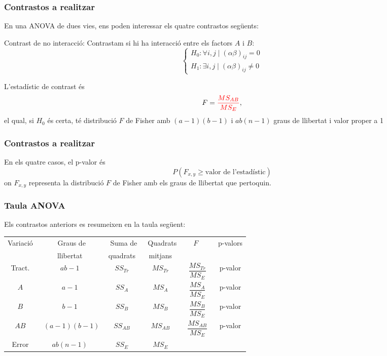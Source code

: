 \documentclass[12pt,t]{beamer}
\newcommand{\red}[1]{\textcolor{red}{#1}}
\renewcommand{\emph}[1]{{\color{red}#1}}
\renewcommand{\geq}{\geqslant}
\theoremstyle{plain}
\theoremstyle{definition}
\begin{document}
\begin{frame}
\frametitle{Contrastos a realitzar}

En una ANOVA de dues vies, ens poden interessar 
els quatre contrastos següents:
\bigskip

\emph{Contrast de no interacció}: Contrastam si  hi ha interacció entre
els factors $A$ i $B$:
$$
\left\{
\begin{array}{l}
H_0 :  \forall i,j\mid (\alpha\beta)_{ij} =0 \\
H_1 :  \exists i,j\mid (\alpha\beta)_{ij}
\not = 0
\end{array}
\right.
$$
\medskip

L'estadístic de contrast és
$$
F = \red{\frac{MS_{AB}}{MS_E}},
$$
el qual, si $H_0$ és certa, té
distribució $F$ de Fisher amb $(a-1)(b-1)$ i $ab(n-1)$ graus de
llibertat  i valor proper a 1

\end{frame}


\begin{frame}
\frametitle{Contrastos a realitzar}

En els quatre casos, el p-valor és
$$
P(F_{x,y}\geq \mbox{valor de l'estadístic})
$$
on $F_{x,y}$ representa la distribució $F$ de Fisher amb els graus de llibertat que pertoquin.

\end{frame}


\begin{frame}
\frametitle{Taula ANOVA}
Els contrastos anteriors es resumeixen en la taula  següent:

{\small \begin{center}
\begin{tabular}{|@{}c@{}|@{}c@{}|@{}c@{}|@{}c@{}|@{}c@{}|@{}c@{}|}
\hline
Variació\hspace*{1ex}&\ Graus de\hspace*{1ex}&\ Suma de\hspace*{1ex}&\ Quadrats\hspace*{1ex}&$F$ &\ p-valors\hspace*{1ex} \\
&llibertat&quadrats&mitjans& &\\\hline
Tract.&$ab-1$&$SS_{Tr}$&$MS_{Tr}$&\ $\dfrac{MS_{Tr}}{MS_E}$ &\ p-valor \\[2ex]
$A$&$a-1$&$SS_A$&$MS_{A}$&\ $\dfrac{MS_{A}}{MS_E}$& \ p-valor\\[2ex]
$B$&$b-1$&$SS_B$&$MS_{B}$&\ $\dfrac{MS_{B}}{MS_E}$& \ p-valor\\[2ex]
$AB$&\ {\footnotesize $(a-1)(b-1)$}\hspace*{1ex}&$SS_{AB}$&$MS_{AB}$&\ $\dfrac{MS_{AB}}{MS_E}$& \ p-valor\\
Error&$ab(n-1)$&$SS_E$&$MS_{E}$&& \\\hline
\end{tabular}
\end{center}
}
\end{frame}
\end{document}

